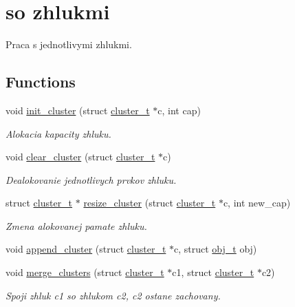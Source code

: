 \hypertarget{group___praca}{}\section{so zhlukmi}
\label{group___praca}


Praca s jednotlivymi zhlukmi.  


\subsection*{Functions}
\begin{DoxyCompactItemize}
\item 
void \hyperlink{group___praca_ga96db0862471d90abb3d80103ef3695f7}{init\+\_\+cluster} (struct \hyperlink{structcluster__t}{cluster\+\_\+t} $\ast$c, int cap)
\begin{DoxyCompactList}\small\item\em Alokacia kapacity zhluku. \end{DoxyCompactList}\item 
void \hyperlink{group___praca_ga8289f092f205baeb13cf33cfffa15324}{clear\+\_\+cluster} (struct \hyperlink{structcluster__t}{cluster\+\_\+t} $\ast$c)
\begin{DoxyCompactList}\small\item\em Dealokovanie jednotlivych prvkov zhluku. \end{DoxyCompactList}\item 
struct \hyperlink{structcluster__t}{cluster\+\_\+t} $\ast$ \hyperlink{group___praca_ga0d8702f8bee3bccb81380e012a615a3d}{resize\+\_\+cluster} (struct \hyperlink{structcluster__t}{cluster\+\_\+t} $\ast$c, int new\+\_\+cap)
\begin{DoxyCompactList}\small\item\em Zmena alokovanej pamate zhluku. \end{DoxyCompactList}\item 
void \hyperlink{group___praca_gab6269b64b2c7f4842a51c58b2d86a2e5}{append\+\_\+cluster} (struct \hyperlink{structcluster__t}{cluster\+\_\+t} $\ast$c, struct \hyperlink{structobj__t}{obj\+\_\+t} obj)
\item 
void \hyperlink{group___praca_gac39a25fdec1f4952ec92ee5407893158}{merge\+\_\+clusters} (struct \hyperlink{structcluster__t}{cluster\+\_\+t} $\ast$c1, struct \hyperlink{structcluster__t}{cluster\+\_\+t} $\ast$c2)
\begin{DoxyCompactList}\small\item\em Spoji zhluk c1 so zhlukom c2, c2 ostane zachovany. \end{DoxyCompactList}\item 

\end{DoxyCompactItemize}
